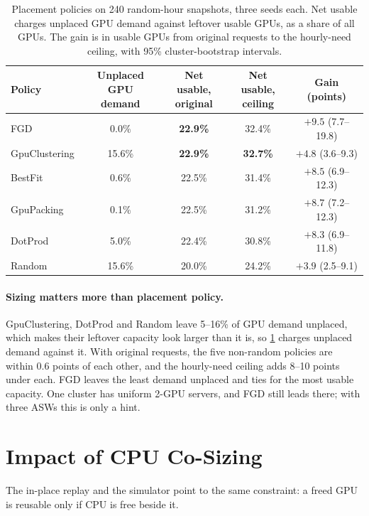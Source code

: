 \documentclass[10pt]{article}
\newcommand{\finding}[1]{\paragraph{#1}}
\begin{document}
\begin{table}[t]
\centering\small
\caption{Placement policies on 240 random-hour snapshots, three seeds each. Net usable charges unplaced GPU demand against leftover usable GPUs, as a share of all GPUs. The gain is in usable GPUs from original requests to the hourly-need ceiling, with 95\% cluster-bootstrap intervals.}
\label{tab:policies}
\begin{tabular}{@{}lcccc@{}}
\toprule
Policy & \makecell{Unplaced GPU\\demand} & \makecell{Net usable,\\original} & \makecell{Net usable,\\ceiling} & \makecell{Gain\\(points)} \\
\midrule
FGD & 0.0\% & \textbf{22.9\%} & 32.4\% & $+9.5$ (7.7--19.8) \\
GpuClustering & 15.6\% & \textbf{22.9\%} & \textbf{32.7\%} & $+4.8$ (3.6--9.3) \\
BestFit & 0.6\% & 22.5\% & 31.4\% & $+8.5$ (6.9--12.3) \\
GpuPacking & 0.1\% & 22.5\% & 31.2\% & $+8.7$ (7.2--12.3) \\
DotProd & 5.0\% & 22.4\% & 30.8\% & $+8.3$ (6.9--11.8) \\
Random & 15.6\% & 20.0\% & 24.2\% & $+3.9$ (2.5--9.1) \\
\bottomrule
\end{tabular}
\end{table}

\finding{Sizing matters more than placement policy.} GpuClustering, DotProd and Random leave 5--16\% of GPU demand unplaced, which makes their leftover capacity look larger than it is, so \cref{tab:policies} charges unplaced demand against it. With original requests, the five non-random policies are within 0.6 points of each other, and the hourly-need ceiling adds 8--10 points under each. FGD leaves the least demand unplaced and ties for the most usable capacity. One cluster has uniform 2-GPU servers, and FGD still leads there; with three ASWs this is only a hint.

\section{Impact of CPU Co-Sizing}
\label{sec:cpu}

The in-place replay and the simulator point to the same constraint: a freed GPU is reusable only if CPU is free beside it.
\end{document}
